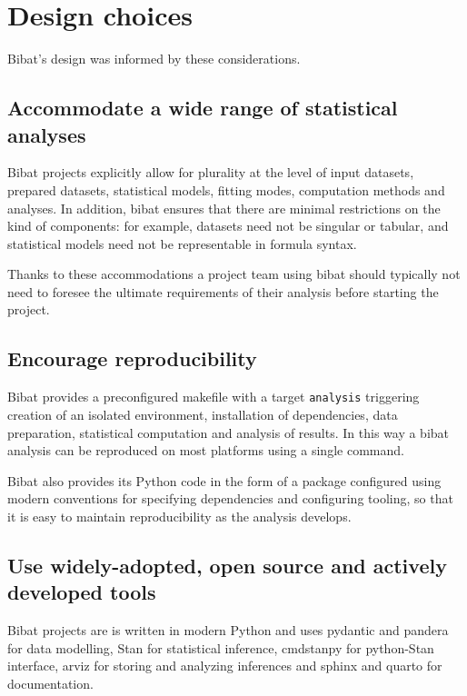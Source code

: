\documentclass[sigconf, review]{acmart}
\begin{document}
\section{Design choices}\label{design-choices}

Bibat's design was informed by these considerations.

\subsection{Accommodate a wide range of statistical
analyses}\label{accommodate-a-wide-range-of-statistical-analyses}

Bibat projects explicitly allow for plurality at the level of input
datasets, prepared datasets, statistical models, fitting modes,
computation methods and analyses. In addition, bibat ensures that there
are minimal restrictions on the kind of components: for example,
datasets need not be singular or tabular, and statistical models need
not be representable in formula syntax.

Thanks to these accommodations a project team using bibat should
typically not need to foresee the ultimate requirements of their
analysis before starting the project.

\subsection{Encourage reproducibility}\label{encourage-reproducibility}

Bibat provides a preconfigured makefile with a target \texttt{analysis}
triggering creation of an isolated environment, installation of
dependencies, data preparation, statistical computation and analysis of
results. In this way a bibat analysis can be reproduced on most
platforms using a single command.

Bibat also provides its Python code in the form of a package configured
using modern conventions for specifying dependencies and configuring
tooling, so that it is easy to maintain reproducibility as the analysis
develops.

\subsection{Use widely-adopted, open source and actively developed
tools}\label{use-widely-adopted-open-source-and-actively-developed-tools}

Bibat projects are is written in modern Python and uses pydantic
\citet{pydanticdevelopersPydantic2022} and pandera
\citep{niels_bantilan-proc-scipy-2020} for data modelling, Stan
\citep{carpenterStanProbabilisticProgramming2017} for statistical
inference, cmdstanpy \citep{standevelopmentteamCmdStanPy2022} for
python-Stan interface, arviz \citep{kumarArviZUnifiedLibrary2019} for
storing and analyzing inferences and sphinx
\citep{georgbrandlandthesphinxteamSphinx2022} and quarto
\citep{Allaire_Quarto_2022} for documentation.
\end{document}
